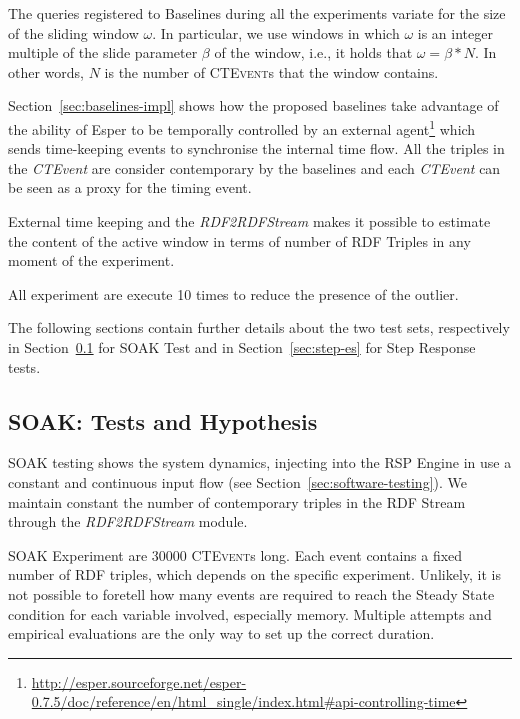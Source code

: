 The queries registered to \name Baselines during all the experiments variate for the size of the sliding window $\omega$. In particular, we use windows in which $\omega$ is an integer multiple of the slide parameter $\beta$ of the window, i.e., it holds that $\omega = \beta * N$. In other words, $N$ is the number of \textsc{CTEvent}s that the window contains. 

Section~\ref{sec:baselines-impl} shows how the proposed baselines take advantage of the ability of Esper to be temporally controlled by an external agent\footnote{\url{http://esper.sourceforge.net/esper-0.7.5/doc/reference/en/html_single/index.html#api-controlling-time}} which sends time-keeping events to synchronise the internal time flow. All the triples in the \textit{CTEvent} are consider contemporary by the baselines and each \textit{CTEvent} can be seen as a proxy for the timing event. 

External time keeping and the \textit{RDF2RDFStream} makes it possible to estimate the content of the active window in terms of number of RDF Triples in any moment of the experiment.

All experiment are execute 10 times to reduce the presence of the outlier.

The following sections contain further details about the two test sets, respectively in Section~\ref{sec:soak-es} for SOAK Test and in Section~\ref{sec:step-es} for Step Response tests.

\subsection{SOAK: Tests and Hypothesis}\label{sec:soak-es}

SOAK testing shows the system dynamics, injecting into the RSP Engine in use a constant and continuous input flow (see Section~\ref{sec:software-testing}). We maintain constant the number of contemporary triples in the RDF Stream through the \textit{RDF2RDFStream} module. %

SOAK Experiment are 30000 \textsc{CTEvent}s long. Each event contains a fixed number of RDF triples, which depends on the specific experiment. Unlikely, it is not possible to foretell how many events are required to reach the Steady State condition for each variable involved, especially memory. Multiple attempts and empirical evaluations are the only way to set up the correct duration.

